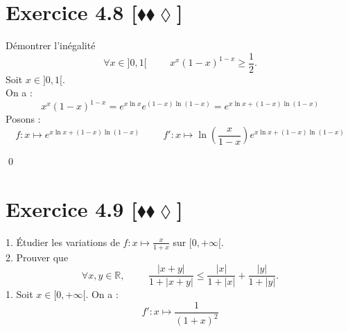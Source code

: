 \documentclass[10pt]{article}
\begin{document}
\section*{Exercice 4.8 [$\blacklozenge\blacklozenge\lozenge$]}
\begin{tcolorbox}[enhanced, width=7in, center, size=fbox, fontupper=\large, drop shadow southwest]
    Démontrer l'inégalité
    \begin{equation*}
        \forall{x\in]0,1[}\hspace{1cm}x^x(1-x)^{1-x}\geq\frac{1}{2}.
    \end{equation*}
    Soit $x\in]0,1[$.\\
    On a :
    \begin{equation*}
        x^x(1-x)^{1-x}=e^{x\ln x}e^{(1-x)\ln(1-x)}=e^{x\ln{x}+(1-x)\ln(1-x)}
    \end{equation*}
    Posons :
    \begin{equation*}
        f:x\mapsto e^{x\ln{x}+(1-x)\ln(1-x)} \hspace{1cm} f':x\mapsto \ln\left(\frac{x}{1-x}\right)e^{x\ln{x}+(1-x)\ln(1-x)}
    \end{equation*}
    \begin{center}
    \end{center}
    \qed
\end{tcolorbox}

\section*{Exercice 4.9 [$\blacklozenge\blacklozenge\lozenge$]}
\begin{tcolorbox}[enhanced, width=7in, center, size=fbox, fontupper=\large, drop shadow southwest]
    1. Étudier les variations de $f:x\mapsto\frac{x}{1+x}$ sur $[0,+\infty[$.\\
    2. Prouver que
    \begin{equation*}
        \forall{x,y\in\mathbb{R}}, \hspace{1cm} \frac{|x+y|}{1+|x+y|}\leq\frac{|x|}{1+|x|}+\frac{|y|}{1+|y|}.
    \end{equation*}
    1. Soit $x\in\lbrack0,+\infty\lbrack$. On a :
    \begin{equation*}
        f':x\mapsto\frac{1}{(1+x)^2}
    \end{equation*}
    \begin{center}
    \end{center}
\end{tcolorbox}
\end{document}
